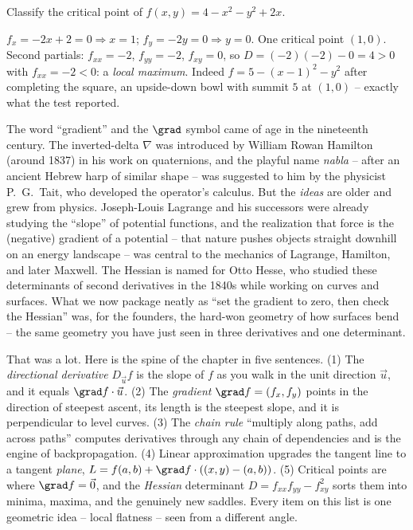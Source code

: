 \begin{example}
\label{ch33:ex-max}
Classify the critical point of $f(x,y)=4 - x^2 - y^2 + 2x$.

$f_x = -2x + 2 = 0 \Rightarrow x = 1$; $f_y = -2y = 0 \Rightarrow y = 0$. One
critical point $(1,0)$. Second partials: $f_{xx}=-2$, $f_{yy}=-2$, $f_{xy}=0$, so
$D = (-2)(-2) - 0 = 4 > 0$ with $f_{xx}=-2<0$: a \emph{local maximum}. Indeed
$f = 5-(x-1)^2 - y^2$ after completing the square, an upside-down bowl with summit
$5$ at $(1,0)$ -- exactly what the test reported.
\end{example}

\begin{historybox}
The word ``gradient'' and the $\grad$ symbol came of age in the nineteenth century.
The inverted-delta $\nabla$ was introduced by William Rowan Hamilton (around 1837)
in his work on quaternions, and the playful name \emph{nabla} -- after an ancient
Hebrew harp of similar shape -- was suggested to him by the physicist P.~G.~Tait,
who developed the operator's calculus. But the \emph{ideas} are older and grew from
physics. Joseph-Louis Lagrange and his successors were already studying the
``slope'' of potential functions, and the realization that force is the (negative)
gradient of a potential -- that nature pushes objects straight downhill on an
energy landscape -- was central to the mechanics of Lagrange, Hamilton, and later
Maxwell. The Hessian is named for Otto Hesse, who studied these determinants of
second derivatives in the 1840s while working on curves and surfaces. What we now
package neatly as ``set the gradient to zero, then check the Hessian'' was, for the
founders, the hard-won geometry of how surfaces bend -- the same geometry you have
just seen in three derivatives and one determinant.
\end{historybox}

\begin{recoverybox}
That was a lot. Here is the spine of the chapter in five sentences. (1) The
\emph{directional derivative} $D_{\vec u}f$ is the slope of $f$ as you walk in the
unit direction $\vec u$, and it equals $\grad f\cdot\vec u$. (2) The
\emph{gradient} $\grad f = (f_x,f_y)$ points in the direction of steepest ascent,
its length is the steepest slope, and it is perpendicular to level curves. (3) The
\emph{chain rule} ``multiply along paths, add across paths'' computes derivatives
through any chain of dependencies and is the engine of backpropagation. (4) Linear
approximation upgrades the tangent line to a tangent \emph{plane},
$L = f(a,b) + \grad f\cdot((x,y)-(a,b))$. (5) Critical points are where
$\grad f = \vec 0$, and the \emph{Hessian} determinant $D=f_{xx}f_{yy}-f_{xy}^2$
sorts them into minima, maxima, and the genuinely new saddles. Every item on this
list is one geometric idea -- local flatness -- seen from a different angle.
\end{recoverybox}

